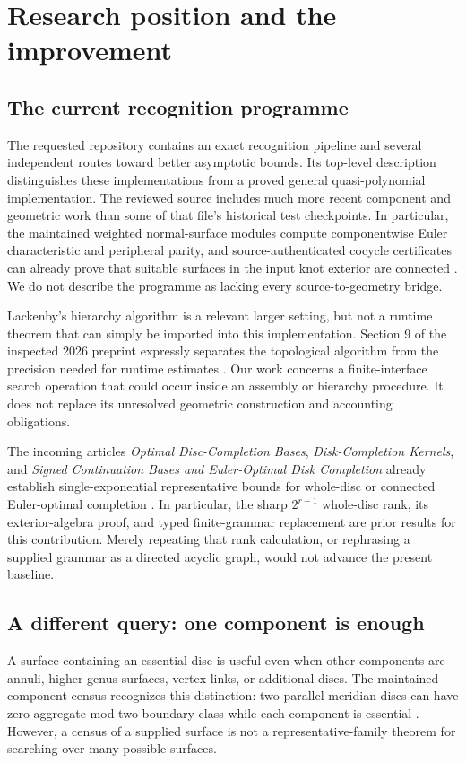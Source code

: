 \documentclass[11pt,letterpaper]{article}
\theoremstyle{definition}
\begin{document}
\section{Research position and the improvement}
\subsection{The current recognition programme}
The requested repository contains an exact recognition pipeline and several independent routes toward better asymptotic bounds. Its top-level description distinguishes these implementations from a proved general quasi-polynomial implementation. The reviewed source includes much more recent component and geometric work than some of that file's historical test checkpoints. In particular, the maintained weighted normal-surface modules compute componentwise Euler characteristic and peripheral parity, and source-authenticated cocycle certificates can already prove that suitable surfaces in the input knot exterior are connected \cite{repo,weighted,cocycle}. We do not describe the programme as lacking every source-to-geometry bridge.

Lackenby's hierarchy algorithm is a relevant larger setting, but not a runtime theorem that can simply be imported into this implementation. Section 9 of the inspected 2026 preprint expressly separates the topological algorithm from the precision needed for runtime estimates \cite{lackenby}. Our work concerns a finite-interface search operation that could occur inside an assembly or hierarchy procedure. It does not replace its unresolved geometric construction and accounting obligations.

The incoming articles \emph{Optimal Disc-Completion Bases}, \emph{Disk-Completion Kernels}, and \emph{Signed Continuation Bases and Euler-Optimal Disk Completion} already establish single-exponential representative bounds for whole-disc or connected Euler-optimal completion \cite{incoming-optimal,incoming-kernel,incoming-signed}. In particular, the sharp $2^{r-1}$ whole-disc rank, its exterior-algebra proof, and typed finite-grammar replacement are prior results for this contribution. Merely repeating that rank calculation, or rephrasing a supplied grammar as a directed acyclic graph, would not advance the present baseline.

\subsection{A different query: one component is enough}
A surface containing an essential disc is useful even when other components are annuli, higher-genus surfaces, vertex links, or additional discs. The maintained component census recognizes this distinction: two parallel meridian discs can have zero aggregate mod-two boundary class while each component is essential \cite{weighted}. However, a census of a supplied surface is not a representative-family theorem for searching over many possible surfaces.
\end{document}
